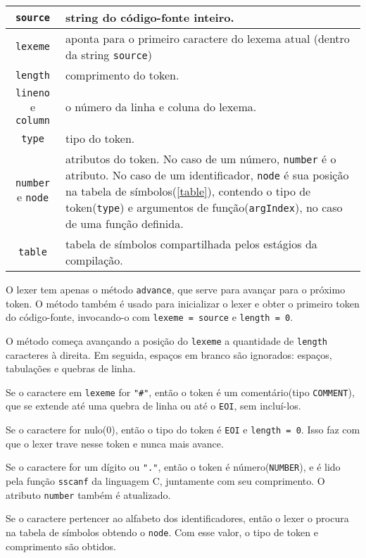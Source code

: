\begin{centering}
\begin{tabularx}{\textwidth}{||c|X||}
\hline \texttt{source} & string do código-fonte inteiro. \\
\hline \texttt{lexeme} & aponta para o primeiro caractere do lexema atual
(dentro da string \texttt{source}) \\
\hline \texttt{length} & comprimento do token. \\
\hline \texttt{lineno} e \texttt{column} & o número da linha e coluna do lexema. \\
\hline \texttt{type} & tipo do token. \\
\hline \texttt{number} e \texttt{node} & atributos do token.
No caso de um número, \texttt{number} é o atributo.
No caso de um identificador, \texttt{node} é sua posição na tabela de símbolos(\ref{table}),
contendo o tipo de token(\texttt{type}) e argumentos de função(\texttt{argIndex}),
no caso de uma função definida.\\
\hline \texttt{table} & tabela de símbolos compartilhada pelos estágios da compilação. \\
\hline
\end{tabularx}
\end{centering}

O lexer tem apenas o método \texttt{advance}, que serve para avançar para o próximo token.
O método também é usado para inicializar o lexer e obter o primeiro token do código-fonte,
invocando-o com \texttt{lexeme = source} e \texttt{length = 0}.

O método começa avançando a posição do \texttt{lexeme} a quantidade de
\texttt{length} caracteres à direita.
Em seguida, espaços em branco são ignorados: espaços, tabulações e quebras de linha.

Se o caractere em \texttt{lexeme} for \texttt{"\#"}, então o token é um
comentário(tipo \texttt{COMMENT}),
que se extende até uma quebra de linha ou até o \texttt{EOI}, sem incluí-los.

Se o caractere for nulo(0), então o tipo do token é \texttt{EOI} e \texttt{length = 0}.
Isso faz com que o lexer trave nesse token e nunca mais avance.

Se o caractere for um dígito ou \texttt{"."}, então o token é número(\texttt{NUMBER}),
e é lido pela função \texttt{sscanf} da linguagem C, juntamente com seu comprimento.
O atributo \texttt{number} também é atualizado.

Se o caractere pertencer ao alfabeto dos identificadores,
então o lexer o procura na tabela de símbolos obtendo o \texttt{node}.
Com esse valor, o tipo de token e comprimento são obtidos.

